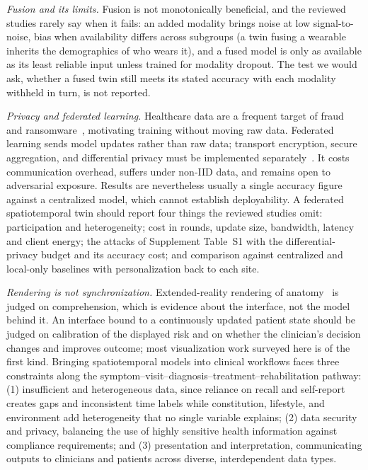 \documentclass[journal]{IEEEtran}
\begin{document}
\emph{Fusion and its limits.} Fusion is not monotonically beneficial, and the reviewed studies rarely say when it fails: an added modality brings noise at low signal-to-noise, bias when availability differs across subgroups (a twin fusing a wearable inherits the demographics of who wears it), and a fused model is only as available as its least reliable input unless trained for modality dropout. The test we would ask, whether a fused twin still meets its stated accuracy with each modality withheld in turn, is not reported.

\emph{Privacy and federated learning.} Healthcare data are a frequent target of fraud and ransomware~\cite{Seh2020HealthcareDataBreaches}, motivating training without moving raw data. Federated learning sends model updates rather than raw data; transport encryption, secure aggregation, and differential privacy must be implemented separately~\cite{aouedi2022FLmedical}. It costs communication overhead, suffers under non-IID data, and remains open to adversarial exposure. Results are nevertheless usually a single accuracy figure against a centralized model, which cannot establish deployability. A federated spatiotemporal twin should report four things the reviewed studies omit: participation and heterogeneity; cost in rounds, update size, bandwidth, latency and client energy; the attacks of Supplement Table~S1 with the differential-privacy budget and its accuracy cost; and comparison against centralized and local-only baselines with personalization back to each site.

\emph{Rendering is not synchronization.} Extended-reality rendering of anatomy~\cite{Louis2021VR} is judged on comprehension, which is evidence about the interface, not the model behind it. An interface bound to a continuously updated patient state should be judged on calibration of the displayed risk and on whether the clinician's decision changes and improves outcome; most visualization work surveyed here is of the first kind.
\else
Bringing spatiotemporal models into clinical workflows faces three constraints along the symptom--visit--diagnosis--treatment--rehabilitation pathway: (1) insufficient and heterogeneous data, since reliance on recall and self-report creates gaps and inconsistent time labels while constitution, lifestyle, and environment add heterogeneity that no single variable explains; (2) data security and privacy, balancing the use of highly sensitive health information against compliance requirements; and (3) presentation and interpretation, communicating outputs to clinicians and patients across diverse, interdependent data types.
\end{document}
